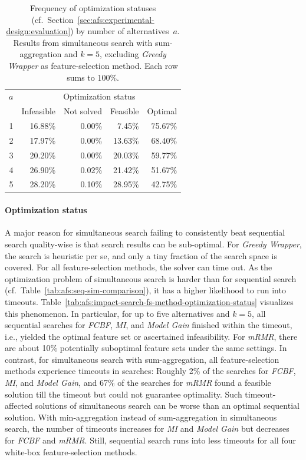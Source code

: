 \documentclass{article}
\theoremstyle{definition}
\begin{document}
\begin{table}[htb]
	\centering
	\begin{tabular}{rrrrr}
		\toprule
		$a$ & \multicolumn{4}{c}{Optimization status} \\
		\cmidrule(r){2-5}
		& Infeasible & Not solved & Feasible & Optimal \\
		\midrule
		1 & 16.88\% & 0.00\% & 7.45\% & 75.67\% \\
		2 & 17.97\% & 0.00\% & 13.63\% & 68.40\% \\
		3 & 20.20\% & 0.00\% & 20.03\% & 59.77\% \\
		4 & 26.90\% & 0.02\% & 21.42\% & 51.67\% \\
		5 & 28.20\% & 0.10\% & 28.95\% & 42.75\% \\
		\bottomrule
	\end{tabular}
	\caption{
		Frequency of optimization statuses (cf.~Section~\ref{sec:afs:experimental-design:evaluation}) by number of alternatives~$a$.
		Results from simultaneous search with sum-aggregation and $k=5$, excluding \emph{Greedy Wrapper} as feature-selection method.
		Each row sums to 100\%.
	}
	\label{tab:afs:impact-num-alternatives-optimization-status}
\end{table}

\paragraph{Optimization status}

A major reason for simultaneous search failing to consistently beat sequential search quality-wise is that search results can be sub-optimal.
For \emph{Greedy Wrapper}, the search is heuristic per se, and only a tiny fraction of the search space is covered.
For all feature-selection methods, the solver can time out.
As the optimization problem of simultaneous search is harder than for sequential search (cf.~Table~\ref{tab:afs:seq-sim-comparison}), it has a higher likelihood to run into timeouts.
Table~\ref{tab:afs:impact-search-fs-method-optimization-status} visualizes this phenomenon.
In particular, for up to five alternatives and $k=5$, all sequential searches for \emph{FCBF}, \emph{MI}, and \emph{Model Gain} finished within the timeout, i.e., yielded the optimal feature set or ascertained infeasibility.
For \emph{mRMR}, there are about 10\% potentially suboptimal feature sets under the same settings.
In contrast, for simultaneous search with sum-aggregation, all feature-selection methods experience timeouts in searches:
Roughly 2\% of the searches for \emph{FCBF}, \emph{MI}, and \emph{Model Gain}, and 67\% of the searches for \emph{mRMR} found a feasible solution till the timeout but could not guarantee optimality.
Such timeout-affected solutions of simultaneous search can be worse than an optimal sequential solution.
With min-aggregation instead of sum-aggregation in simultaneous search, the number of timeouts increases for \emph{MI} and \emph{Model Gain} but decreases for \emph{FCBF} and \emph{mRMR}.
Still, sequential search runs into less timeouts for all four white-box feature-selection methods.
\end{document}
